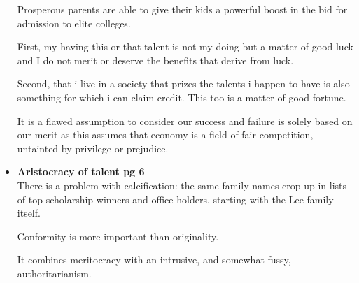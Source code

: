 \documentclass[11pt]{article}
\begin{document}
\begin{itemize}
{       Prosperous parents are able to give their kids a powerful boost in the bid for admission to elite colleges.
       
       First, my having this or that talent is not my doing but a matter of good luck and I do not merit or deserve the benefits that derive from luck.
       
       Second, that i live in a society that prizes the talents i happen to have is also something for which i can claim credit. This too is a matter of good fortune.
       
       It is a flawed assumption to consider our success and failure is solely based on our merit as this assumes that economy is a field of fair competition, untainted by privilege or prejudice.
       }
       \item{
                   \textbf{Aristocracy of talent pg 6}
                   \\           There is a problem with calcification: the same family names crop up in lists of top scholarship winners and office-holders, starting with the Lee family itself.
                   
                   Conformity is more important than originality.
                   
                   It combines meritocracy with an intrusive, and somewhat fussy, authoritarianism.
             }
\end{itemize}
\end{document}
